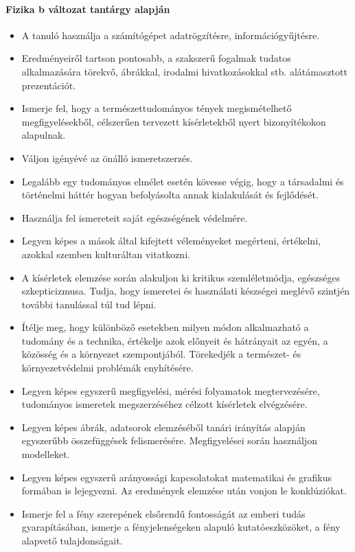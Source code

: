 \paragraph{Fizika
	b változat tantárgy alapján}
\begin{itemize}
\item A tanuló használja a számítógépet adatrögzítésre, információgyűjtésre.
\item Eredményeiről tartson pontosabb, a szakszerű fogalmak tudatos alkalmazására törekvő, ábrákkal, irodalmi hivatkozásokkal stb. alátámasztott prezentációt.
\item Ismerje fel, hogy a természettudományos tények megismételhető megfigyelésekből, célszerűen tervezett kísérletekből nyert bizonyítékokon alapulnak.
\item Váljon igényévé az önálló ismeretszerzés.
\item Legalább egy tudományos elmélet esetén kövesse végig, hogy a társadalmi és történelmi háttér hogyan befolyásolta annak kialakulását és fejlődését.
\item Használja fel ismereteit saját egészségének védelmére.
\item Legyen képes a mások által kifejtett véleményeket megérteni, értékelni, azokkal szemben kulturáltan vitatkozni.
\item A kísérletek elemzése során alakuljon ki kritikus szemléletmódja, egészséges szkepticizmusa. Tudja, hogy ismeretei és használati készségei meglévő szintjén további tanulással túl tud lépni.
\item Ítélje meg, hogy különböző esetekben milyen módon alkalmazható a tudomány és a technika, értékelje azok előnyeit és hátrányait az egyén, a közösség és a környezet szempontjából. Törekedjék a természet- és környezetvédelmi problémák enyhítésére.
\item Legyen képes egyszerű megfigyelési, mérési folyamatok megtervezésére, tudományos ismeretek megszerzéséhez célzott kísérletek elvégzésére.
\item Legyen képes ábrák, adatsorok elemzéséből tanári irányítás alapján egyszerűbb összefüggések felismerésére. Megfigyelései során használjon modelleket.
\item Legyen képes egyszerű arányossági kapcsolatokat matematikai és grafikus formában is lejegyezni. Az eredmények elemzése után vonjon le konklúziókat.
\item Ismerje fel a fény szerepének elsőrendű fontosságát az emberi tudás gyarapításában, ismerje a fényjelenségeken alapuló kutatóeszközöket, a fény alapvető tulajdonságait.

\end{itemize}
